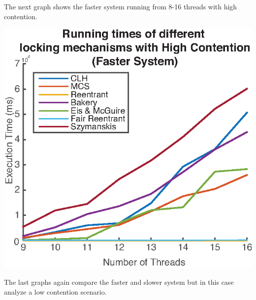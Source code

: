 \documentclass[FinalReport.tex]{subfiles}
\begin{document}
\bigskip

The next graph shows the faster system running from 8-16 threads with high contention.


\bigskip
	
	\begin{center}
	\includegraphics[scale = .8]{figures/myComp_8-16_1000.eps}
	\end{center}	


\bigskip

The last graphs again compare the faster and slower system but in this case analyze a low contention scenario.

\bigskip
\end{document}
